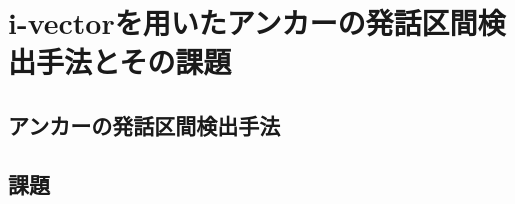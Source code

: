 \chapter{i-vectorを用いたアンカーの発話区間検出手法とその課題}

\section{アンカーの発話区間検出手法}
\label{section:clustering}


\section{課題}

